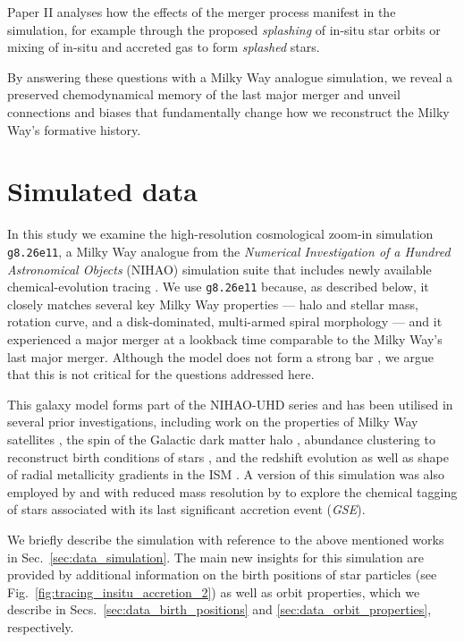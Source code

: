 \documentclass[fleqn,usenatbib]{mnras}
\begin{document}
Paper II analyses how the effects of the merger process manifest in the simulation, for example through the proposed \textit{splashing} of in-situ star orbits \citep{Belokurov2020} or mixing of in-situ and accreted gas to form \textit{splashed} stars.

By answering these questions with a Milky Way analogue simulation, we reveal a preserved chemodynamical memory of the last major merger and unveil connections and biases that fundamentally change how we reconstruct the Milky Way's formative history.

\section{Simulated data} \label{sec:data}

In this study we examine the high-resolution cosmological zoom-in simulation \texttt{g8.26e11}, a Milky Way analogue from the \textit{Numerical Investigation of a Hundred Astronomical Objects} (NIHAO) simulation suite \citep{Wang2015} that includes newly available chemical-evolution tracing \citep{Buck2021}.
We use \texttt{g8.26e11} because, as described below, it closely matches several key Milky Way properties — halo and stellar mass, rotation curve, and a disk-dominated, multi-armed spiral morphology — and it experienced a major merger at a lookback time comparable to the Milky Way's last major merger.
Although the model does not form a strong bar \citep[see][]{Buder2025}, we argue that this is not critical for the questions addressed here.

This galaxy model forms part of the NIHAO-UHD series \citep{Buck2020b} and has been utilised in several prior investigations, including work on the properties of Milky Way satellites \citep{Buck2019b}, the spin of the Galactic dark matter halo \citep{Obreja2022}, abundance clustering to reconstruct birth conditions of stars \citep{Ratcliffe2022}, and the redshift evolution as well as shape of radial metallicity gradients in the ISM \citep{Ratcliffe2025, Buder2025}. A version of this simulation was also employed by \citet{Buck2023} and with reduced mass resolution by \citet{Buder2024} to explore the chemical tagging of stars associated with its last significant accretion event (\textit{GSE}).

We briefly describe the simulation with reference to the above mentioned works in Sec.~\ref{sec:data_simulation}. The main new insights for this simulation are provided by additional information on the birth positions of star particles (see Fig.~\ref{fig:tracing_insitu_accretion_2}) as well as orbit properties, which we describe in Secs.~\ref{sec:data_birth_positions} and \ref{sec:data_orbit_properties}, respectively.
\end{document}
